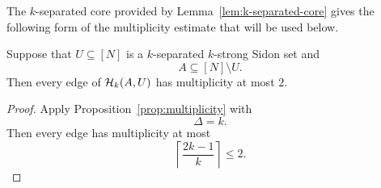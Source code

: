 \documentclass[reqno,a4paper,12pt]{amsart}
\begin{document}
The \(k\)-separated core provided by
Lemma~\ref{lem:k-separated-core} gives the following form of the
multiplicity estimate that will be used below.

\begin{corollary}
    \label{cor:multiplicity}
    Suppose that \(U\subseteq[N]\) is a \(k\)-separated
    \(k\)-strong Sidon set and
    \[
        A\subseteq[N]\setminus U.
    \]
    Then every edge of \(\mathcal{H}_k(A,U)\) has multiplicity at most \(2\).
\end{corollary}

\begin{proof}
    Apply Proposition~\ref{prop:multiplicity} with
    \[
        \Delta=k.
    \]
    Then every edge has multiplicity at most
    \[
        \left\lceil\frac{2k-1}{k}\right\rceil
        \leq2.
    \]
\end{proof}
\end{document}
